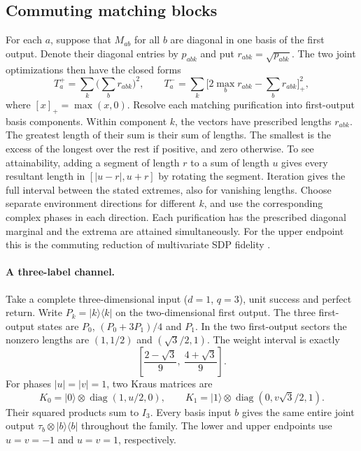 \documentclass[11pt,letterpaper]{article}
\begin{document}
\subsection{Commuting matching blocks}
For each $a$, suppose that $M_{ab}$ for all $b$ are diagonal in one basis of the first output. Denote their diagonal entries by $p_{abk}$ and put $r_{abk}=\sqrt{p_{abk}}$. The two joint optimizations then have the closed forms
\[
 T_a^+=\sum_k\Big(\sum_b r_{abk}\Big)^2,\qquad
 T_a^-=\sum_k\Big[2\max_b r_{abk}-\sum_b r_{abk}\Big]_+^2 ,
\]
where $[x]_+=\max(x,0)$. Resolve each matching purification into first-output basis components. Within component $k$, the vectors have prescribed lengths $r_{abk}$. The greatest length of their sum is their sum of lengths. The smallest is the excess of the longest over the rest if positive, and zero otherwise. To see attainability, adding a segment of length $r$ to a sum of length $u$ gives every resultant length in $[|u-r|,u+r]$ by rotating the segment. Iteration gives the full interval between the stated extremes, also for vanishing lengths. Choose separate environment directions for different $k$, and use the corresponding complex phases in each direction. Each purification has the prescribed diagonal marginal and the extrema are attained simultaneously. For the upper endpoint this is the commuting reduction of multivariate SDP fidelity \cite{multi}.

\paragraph{A three-label channel.}
Take a complete three-dimensional input ($d=1$, $q=3$), unit success and perfect return. Write $P_k=|k\rangle\langle k|$ on the two-dimensional first output. The three first-output states are $P_0$, $(P_0+3P_1)/4$ and $P_1$. In the two first-output sectors the nonzero lengths are $(1,1/2)$ and $(\sqrt3/2,1)$. The weight interval is exactly
\[
 \left[\frac{2-\sqrt3}{9},\ \frac{4+\sqrt3}{9}\right].
\]
For phases $|u|=|v|=1$, two Kraus matrices are
\[
 K_0=|0\rangle\otimes\operatorname{diag}(1,u/2,0),\qquad
 K_1=|1\rangle\otimes\operatorname{diag}(0,v\sqrt3/2,1).
\]
Their squared products sum to $I_3$. Every basis input $b$ gives the same entire joint output $\tau_b\otimes|b\rangle\langle b|$ throughout the family. The lower and upper endpoints use $u=v=-1$ and $u=v=1$, respectively.
\end{document}

